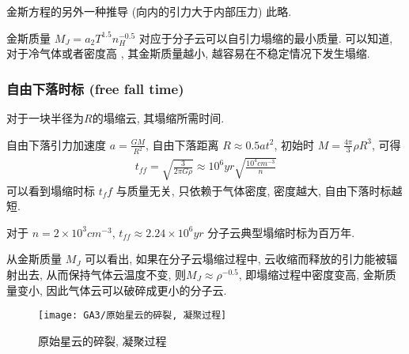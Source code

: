 金斯方程的另外一种推导 (向内的引力大于内部压力) 此略. 

金斯质量 $M_J=a_2T^{1.5}n_H^{-0.5}$ 对应于分子云可以自引力塌缩的最小质量.  可以知道, 对于冷气体或者密度高 , 其金斯质量越小, 越容易在不稳定情况下发生塌缩.  

\subsubsection{自由下落时标 (free fall time)}
对于一块半径为$R$的塌缩云, 其塌缩所需时间. 

自由下落引力加速度 $a=\frac{GM}{R^2}$, 自由下落距离 $R\approx 0.5at^2$, 初始时 $M=\frac{4\pi}{3}\rho R^3$, 可得
\begin{align*}
    t_{ff}=\sqrt{\frac{3}{2\pi G\rho}}\approx 10^6 yr\sqrt{\frac{10^4cm^{-3}}{n}}
\end{align*}
可以看到塌缩时标 $t_ff$ 与质量无关, 只依赖于气体密度, 密度越大, 自由下落时标越短. 

对于 $n=2\times 10^3 cm^{-3}$, $t_{ff}\approx 2.24\times 10^6 yr$ 分子云典型塌缩时标为百万年. 


从金斯质量 $M_J$ 可以看出, 如果在分子云塌缩过程中, 云收缩而释放的引力能被辐射出去, 从而保持气体云温度不变, 则$M_J\approx \rho^{-0.5}$, 即塌缩过程中密度变高, 金斯质量变小, 因此气体云可以破碎成更小的分子云. 

\begin{figure}[!htb]
    \centering
    \texttt{[image: GA3/原始星云的碎裂, 凝聚过程]}
    \caption{原始星云的碎裂, 凝聚过程}
\end{figure}

